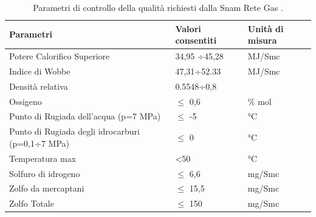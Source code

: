 \begin{table}[htbp]
    \small
    \centering
    \caption{Parametri di controllo della qualità richiesti dalla Snam Rete Gas \parencite{snam2015codice}.}
    \label{tab:ng-specifiche}
    \begin{tabular}{p{}p{}p{}}
        \hline 
        {\bf Parametri} & \multicolumn{1}{l}{{\bf Valori consentiti}} & {\bf Unità di misura} \\ \hline \hline
        Potere Calorifico Superiore & 34,95 ÷45,28 & MJ/Smc \\\hline
        Indice di Wobbe & 47,31÷52.33 & MJ/Smc \\\hline
        Densità relativa & 0.5548÷0,8 &  \\\hline
        Ossigeno & \(\leq\) 0,6 & \% mol \\\hline
        Punto di Rugiada dell'acqua (p=7 MPa) & \(\leq\) -5 & °C \\\hline
        Punto di Rugiada degli idrocarburi (p=0,1÷7 MPa) & \(\leq\) 0 & °C \\\hline
        Temperatura max & \textless 50 & °C \\\hline
        Solfuro di idrogeno & \(\leq\) 6,6 & mg/Smc \\\hline
        Zolfo da mercaptani & \(\leq\) 15,5 & mg/Smc \\\hline
        Zolfo Totale & \(\leq\) 150 & mg/Smc \\ \hline
    \end{tabular}
\end{table}

